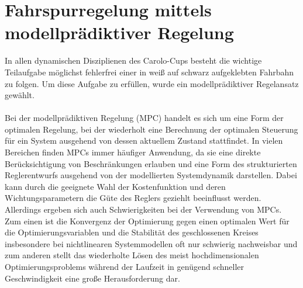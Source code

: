 \section{Fahrspurregelung mittels modellprädiktiver Regelung}
In allen dynamischen Disziplienen des Carolo-Cups besteht die wichtige Teilaufgabe möglichst fehlerfrei einer in weiß auf schwarz aufgeklebten Fahrbahn zu folgen. Um diese Aufgabe zu erfüllen, wurde ein modellprädiktiver Regelansatz gewählt.\\ \\ 
Bei der modellprädiktiven Regelung (MPC) handelt es sich um eine Form der optimalen Regelung, bei der wiederholt eine Berechnung der optimalen Steuerung für ein System ausgehend von dessen aktuellem Zustand stattfindet. In vielen Bereichen finden MPCs immer häufiger Anwendung, da sie eine direkte Berücksichtigung von Beschränkungen erlauben und eine Form des strukturierten Reglerentwurfs ausgehend von der modellierten Systemdynamik darstellen. Dabei kann durch die geeignete Wahl der Kostenfunktion und deren Wichtungsparametern die Güte des Reglers geziehlt beeinflusst werden. Allerdings ergeben sich auch Schwierigkeiten bei der Verwendung von MPCs. Zum einen ist die Konvergenz der Optimierung gegen einen optimalen Wert für die Optimierungsvariablen und die Stabilität des geschlossenen Kreises insbesondere bei nichtlinearen Systemmodellen oft nur schwierig nachweisbar und zum anderen stellt das wiederholte Lösen des meist hochdimensionalen Optimierungsproblems während der Laufzeit in genügend schneller Geschwindigkeit eine große Herausforderung dar.
\\
